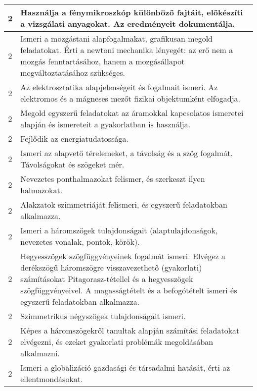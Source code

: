 \begin{longtable}{c | p{12cm} }
                                
                                          2 &  Használja a fénymikroszkóp különböző fajtáit, előkészíti a vizsgálati anyagokat. Az eredményeit dokumentálja. \\ \hline
                                          2 &  Ismeri a mozgástani alapfogalmakat, grafikusan megold feladatokat. Érti a newtoni mechanika lényegét: az erő nem a mozgás fenntartásához, hanem a mozgásállapot megváltoztatásához szükséges. \\ \hline
                                          2 &  Az elektrosztatika alapjelenségeit és fogalmait ismeri. Az elektromos és a mágneses mezőt fizikai objektumként elfogadja. \\ \hline
                                          2 &  Megold egyszerű feladatokat az áramokkal kapcsolatos ismeretei alapján és ismereteit a gyakorlatban is használja. \\ \hline
                                          2 &  Fejlődik az energiatudatossága. \\ \hline
                                          2 &  Ismeri az alapvető térelemeket, a távolság és a szög fogalmát. Távolságokat és szögeket mér. \\ \hline
                                          2 &  Nevezetes ponthalmazokat felismer, és szerkeszt ilyen halmazokat. \\ \hline
                                          2 &  Alakzatok szimmetriáját felismeri, és egyszerű feladatokban alkalmazza. \\ \hline
                                          2 &  Ismeri a háromszögek tulajdonságait (alaptulajdonságok, nevezetes vonalak, pontok, körök). \\ \hline
                                          2 &  Hegyesszögek szögfüggvényeinek fogalmát ismeri.
Elvégez a derékszögű háromszögre visszavezethető (gyakorlati) számításokat Pitagorasz-tétellel és a hegyesszögek szögfüggvényeivel. A magasságtételt és a befogótételt ismeri és egyszerű feladatokban alkalmazza. \\ \hline
                                          2 &  Szimmetrikus négyszögek tulajdonságait ismeri. \\ \hline
                                          2 &  Képes a háromszögekről tanultak alapján számítási feladatokat elvégezni, és ezeket gyakorlati problémák megoldásában alkalmazni. \\ \hline
                                          2 &  Ismeri a globalizáció gazdasági és társadalmi hatását, érti az ellentmondásokat. \\ \hline

\end{longtable}

